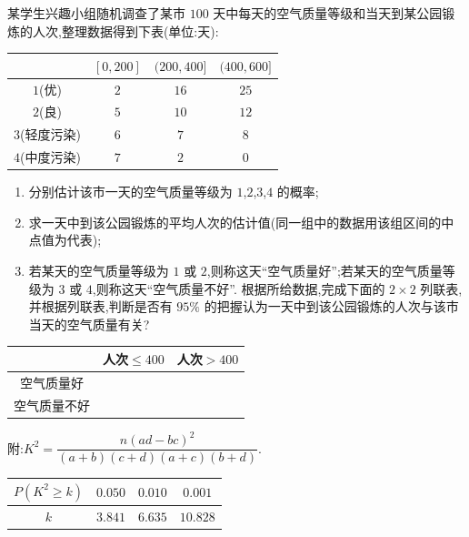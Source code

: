 \begin{problem}
某学生兴趣小组随机调查了某市 \(100\) 天中每天的空气质量等级和当天到某公园锻炼的人次,整理数据得到下表(单位:天):


\newcommand{\airqualityheader}{%
    \choicebitmap[width=6.5cm,trim=4bp 0bp 0bp 15bp,clip]{img/2020/national_paper_3_liberal/q18_fig1.png}%
}

\begin{center}
\begin{tabular}{c|ccc}
\airqualityheader & \([0,200]\) & \((200,400]\) & \((400,600]\) \\
\hline
\(1\)(优) & \(2\) & \(16\) & \(25\) \\
\(2\)(良) & \(5\) & \(10\) & \(12\) \\
\(3\)(轻度污染) & \(6\) & \(7\) & \(8\) \\
\(4\)(中度污染) & \(7\) & \(2\) & \(0\)
\end{tabular}
\end{center}

\begin{enumerate}
    \item 分别估计该市一天的空气质量等级为 \(1\),\(2\),\(3\),\(4\) 的概率;
    \item 求一天中到该公园锻炼的平均人次的估计值(同一组中的数据用该组区间的中点值为代表);
    \item 若某天的空气质量等级为 \(1\) 或 \(2\),则称这天``空气质量好'';若某天的空气质量等级为 \(3\) 或 \(4\),则称这天``空气质量不好''. 根据所给数据,完成下面的 \(2\times 2\) 列联表,并根据列联表,判断是否有 \(95\%\) 的把握认为一天中到该公园锻炼的人次与该市当天的空气质量有关?
\end{enumerate}

\begin{center}
\begin{tabular}{c|cc}
 & 人次\(\le 400\) & 人次\(>400\) \\
\hline
空气质量好 &  &  \\
空气质量不好 &  &
\end{tabular}
\end{center}

附:\(K^2=\dfrac{n(ad-bc)^2}{(a+b)(c+d)(a+c)(b+d)}\).

\begin{center}
\begin{tabular}{c|ccc}
\(P(K^2\ge k)\) & \(0.050\) & \(0.010\) & \(0.001\) \\
\hline
\(k\) & \(3.841\) & \(6.635\) & \(10.828\)
\end{tabular}
\end{center}
\end{problem}

